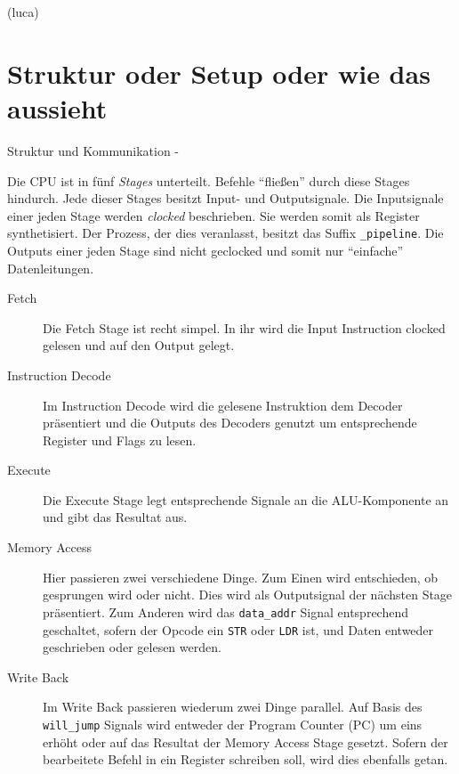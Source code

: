 \documentclass[paper=a4,fontsize=12pt,twocolumn]{scrreprt}
\begin{document}
(luca)

\section{Struktur oder Setup oder wie das aussieht}
Struktur und Kommunikation -


Die CPU ist in fünf \textit{Stages} unterteilt.
Befehle \enquote{fließen} durch diese Stages hindurch.
Jede dieser Stages besitzt Input- und Outputsignale.
Die Inputsignale einer jeden Stage werden \textit{clocked} beschrieben.
Sie werden somit als Register synthetisiert.
Der Prozess, der dies veranlasst, besitzt das Suffix \texttt{\_pipeline}.
Die Outputs einer jeden Stage sind nicht geclocked und somit nur \enquote{einfache} Datenleitungen.

\begin{description}
  \item[Fetch]
  Die Fetch Stage ist recht simpel.
  In ihr wird die Input Instruction clocked gelesen und auf den Output gelegt.
  \item[Instruction Decode]
  Im Instruction Decode wird die gelesene Instruktion dem Decoder präsentiert und die Outputs des Decoders genutzt um entsprechende Register und Flags zu lesen.
  \item[Execute]
  Die Execute Stage legt entsprechende Signale an die ALU-Komponente an und gibt das Resultat aus.
  \item[Memory Access]
  Hier passieren zwei verschiedene Dinge.
  Zum Einen wird entschieden, ob gesprungen wird oder nicht.
  Dies wird als Outputsignal der nächsten Stage präsentiert.
  Zum Anderen wird das \texttt{data\_addr} Signal entsprechend geschaltet, sofern der Opcode ein \texttt{STR} oder \texttt{LDR} ist, und Daten entweder geschrieben oder gelesen werden.
  \item[Write Back]
  Im Write Back passieren wiederum zwei Dinge parallel.
  Auf Basis des \texttt{will\_jump} Signals wird entweder der Program Counter (PC) um eins erhöht oder auf das Resultat der Memory Access Stage gesetzt.
  Sofern der bearbeitete Befehl in ein Register schreiben soll, wird dies ebenfalls getan.
\end{description}
\end{document}

